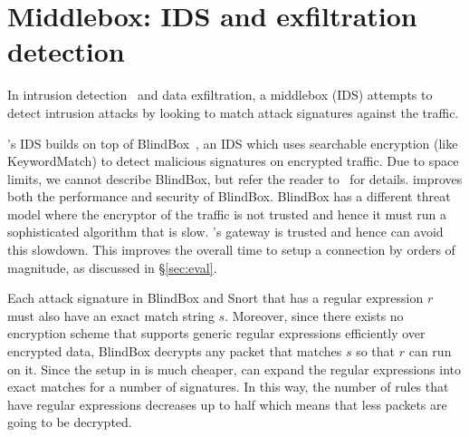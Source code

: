 


\section{Middlebox: IDS and exfiltration detection}\label{sec:ids}


In intrusion detection~\cite{Snort} and data exfiltration, a middlebox (IDS) attempts to detect intrusion attacks by looking to match attack signatures against the traffic.


\sys's IDS builds on top of BlindBox~\cite{blindbox}, an IDS which uses searchable encryption (like KeywordMatch) to detect malicious signatures on encrypted traffic.  Due to space limits, we cannot describe BlindBox, but refer  the reader to~\cite{blindbox} for details.  \sys improves both the performance and security of BlindBox. BlindBox has a different threat model where the encryptor of the traffic is not trusted and hence it must run a sophisticated algorithm that is slow. \sys's gateway is trusted and hence \sys can avoid this slowdown. This improves the overall time to setup a connection by orders of magnitude, as discussed in \S\ref{sec:eval}. 

Each attack signature in BlindBox and Snort that has a regular expression $r$ must also have an exact match string $s$. Moreover, since there exists no encryption scheme that supports generic regular expressions efficiently over encrypted data, BlindBox decrypts any packet that matches $s$ so that $r$ can run on it. Since the setup in \sys is much cheaper,  \sys can expand the regular expressions into exact matches for a number of signatures. In this way, the number of rules that have regular expressions decreases up to half which means that less packets are going to be decrypted.

